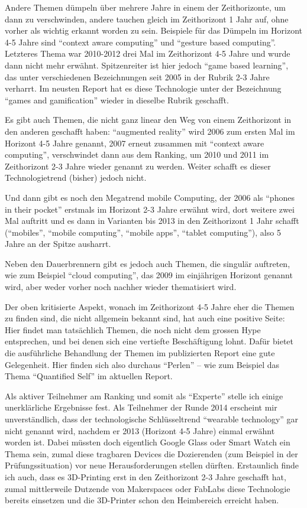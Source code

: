 \documentclass[a4paper,
fontsize=11pt,
oneside,
numbers=noperiodatend,
parskip=half-,
bibliography=totoc,
final
]{scrartcl}
\begin{document}
Andere Themen dümpeln über mehrere Jahre in einem der Zeithorizonte, um
dann zu verschwinden, andere tauchen gleich im Zeithorizont 1 Jahr auf,
ohne vorher als wichtig erkannt worden zu sein. Beispiele für das
Dümpeln im Horizont 4-5 Jahre sind \enquote{context aware computing} und
\enquote{gesture based computing}. Letzteres Thema war 2010-2012 drei
Mal im Zeithorizont 4-5 Jahre und wurde dann nicht mehr erwähnt.
Spitzenreiter ist hier jedoch \enquote{game based learning}, das unter
verschiedenen Bezeichnungen seit 2005 in der Rubrik 2-3 Jahre verharrt.
Im neusten Report hat es diese Technologie unter der Bezeichnung
\enquote{games and gamification} wieder in dieselbe Rubrik geschafft.

Es gibt auch Themen, die nicht ganz linear den Weg von einem
Zeithorizont in den anderen geschafft haben: \enquote{augmented reality}
wird 2006 zum ersten Mal im Horizont 4-5 Jahre genannt, 2007 erneut
zusammen mit \enquote{context aware computing}, verschwindet dann aus
dem Ranking, um 2010 und 2011 im Zeithorizont 2-3 Jahre wieder genannt
zu werden. Weiter schafft es dieser Technologietrend (bisher) jedoch
nicht.

Und dann gibt es noch den Megatrend mobile Computing, der 2006 als
\enquote{phones in their pocket} erstmals im Horizont 2-3 Jahre erwähnt
wird, dort weitere zwei Mal auftritt und es dann in Varianten bis 2013
in den Zeithorizont 1 Jahr schafft (\enquote{mobiles}, \enquote{mobile
computing}, \enquote{mobile apps}, \enquote{tablet computing}), also 5
Jahre an der Spitze ausharrt.

Neben den Dauerbrennern gibt es jedoch auch Themen, die singulär
auftreten, wie zum Beispiel \enquote{cloud computing}, das 2009 im
einjährigen Horizont genannt wird, aber weder vorher noch nachher wieder
thematisiert wird.

Der oben kritisierte Aspekt, wonach im Zeithorizont 4-5 Jahre eher die
Themen zu finden sind, die nicht allgemein bekannt sind, hat auch eine
positive Seite: Hier findet man tatsächlich Themen, die noch nicht dem
grossen Hype entsprechen, und bei denen sich eine vertiefte
Beschäf\-tigung lohnt. Dafür bietet die ausführliche Behandlung der Themen
im publizierten Report eine gute Gelegenheit. Hier finden sich also
durchaus \enquote{Perlen} -- wie zum Beispiel das Thema
\enquote{Quantified Self} im aktuellen Report.

Als aktiver Teilnehmer am Ranking und somit als \enquote{Experte} stelle
ich einige unerklärliche Ergebnisse fest. Als Teilnehmer der Runde 2014
erscheint mir unverständlich, dass der technologische Schlüsseltrend
\enquote{wearable technology} gar nicht genannt wird, nachdem er 2013
(Horizont 4-5 Jahre) einmal erwähnt worden ist. Dabei müssten doch
eigentlich Google Glass oder Smart Watch ein Thema sein, zumal diese
tragbaren Devices die Dozierenden (zum Beispiel in der
Prüfungssituation) vor neue Herausforderungen stellen dürften.
Erstaunlich finde ich auch, dass es 3D-Printing erst in den Zeithorizont
2-3 Jahre geschafft hat, zumal mittlerweile Dutzende von Makerspaces
oder FabLabs diese Technologie bereits einsetzen und die 3D-Printer
schon den Heimbereich erreicht haben.
\end{document}
